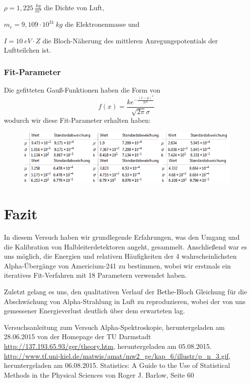 \documentclass[bigchapter,colorback,accentcolor=tud4b,linedtoc,11pt]{tudreport}
\begin{document}
$\rho = 1,225~ \frac{kg}{m^3}$ die Dichte von Luft,

$m_e = 9,109 \cdot 10^{31}~ kg$ die Elektronenmasse und

$I = 10~ eV \cdot Z$ die Bloch-Näherung des mittleren Anregungspotentials der Luftteilchen ist.

\subsection{Fit-Parameter}
Die gefitteten Gauß-Funktionen haben die Form von 
$$f(x)=\frac{k e^{-\frac{(x-\mu )^2}{2 \sigma ^2}}}{\sqrt{2 \pi } \sigma }$$
wodurch wir diese Fit-Parameter erhalten haben:
\begin{figure}[H]
\centering
    \includegraphics[scale=1]{img/air-gauss-fits.png}
\end{figure}

\chapter{Fazit}
In diesem Versuch haben wir grundlegende Erfahrungen, was den Umgang und die
Kalibration von Halbleiterdetektoren angeht, gesammelt. Anschließend war es uns
möglich, die Energien und relativen Häufigkeiten der 4 wahrscheinlichsten Alpha-Übergänge von
Americium-241 zu bestimmen, wobei wir erstmals ein iteratives Fit-Verfahren mit
18 Parametern verwendet haben.

Zuletzt gelang es uns, den qualitativen Verlauf der Bethe-Bloch Gleichung für
die Abschwächung von Alpha-Strahlung in Luft zu reproduzieren, wobei der von uns
gemessener Energieverlust deutlich über dem erwarteten lag.
\cleardoublepage{}
\newpage
\begin{thebibliography}{100}
   Versuchsanleitung zum Versuch Alpha-Spektroskopie, heruntergeladen am 28.06.2015 von der Homepage der TU Darmstadt
  \url{http://137.193.65.93/ger/theory.htm}, heruntergeladen am 05.08.2015.
  \url{http://www.tf.uni-kiel.de/matwis/amat/mw2_ge/kap_6/illustr/p_n_3.gif}, heruntergeladen am 06.08.2015.
   Statistics: A Guide to the Use of Statistical Methods in the
    Physical Sciences von Roger J. Barlow, Seite 60
\end{thebibliography}
\end{document}
